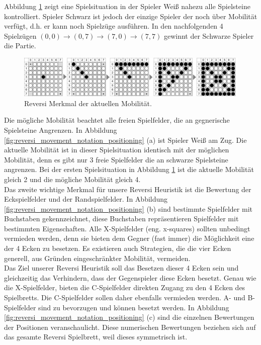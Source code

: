 Abbildung \ref{fig:reversi_maximum_disk_strategy} zeigt eine Spielsituation in der Spieler Weiß nahezu alle Spielsteine kontrolliert. Spieler Schwarz ist jedoch der einzige Spieler der noch über Mobilität verfügt, d.h. er kann noch Spielzüge ausführen. In den nachfolgenden 4 Spielzügen $(0,0) \rightarrow (0,7) \rightarrow (7,0) \rightarrow (7,7)$ gewinnt der Schwarze Spieler die Partie. \\

\begin{figure}[!htbp]
  \centering
  \includegraphics[scale = 0.3]{inhalt/abbildungen/reversi_maximum_disk_strategy.pdf}
  \caption{Reversi Merkmal der aktuellen Mobilität.}
  \label{fig:reversi_maximum_disk_strategy}
\end{figure}

Die mögliche Mobilität beachtet alle freien Spielfelder, die an gegnerische Spielsteine Angrenzen. In Abbildung \ref{fig:reversi_movement_notation_positioning} (a) ist Spieler Weiß am Zug. Die aktuelle Mobilität ist in dieser Spielsituation identisch mit der möglichen Mobilität, denn es gibt nur 3 freie Spielfelder die an schwarze Spielsteine angrenzen. Bei der ersten Spielsituation in Abbildung \ref{fig:reversi_maximum_disk_strategy} ist die aktuelle Mobilität gleich 2 und die mögliche Mobilität gleich 4.\\

Das zweite wichtige Merkmal für unsere Reversi Heuristik ist die Bewertung der Eckspielfelder und der Randspielfelder. In Abbildung \ref{fig:reversi_movement_notation_positioning} (b) sind bestimmte Spielfelder mit Buchstaben gekennzeichnet, diese Buchstaben repräsentieren Spielfelder mit bestimmten Eigenschaften. Alle X-Spielfelder (eng. x-squares) sollten unbedingt vermieden werden, denn sie bieten dem Gegner (fast immer) die Möglichkeit eine der 4 Ecken zu besetzen. Es existieren auch Strategien, die die vier Ecken generell, aus Gründen eingeschränkter Mobilität, vermeiden. \\

Das Ziel unserer Reversi Heuristik soll das Besetzen dieser 4 Ecken sein und gleichzeitig das Verhindern, dass der Gegenspieler diese Ecken besetzt. Genau wie die X-Spielfelder, bieten die C-Spielfelder direkten Zugang zu den 4 Ecken des Spielbretts. Die C-Spielfelder sollen daher ebenfalls vermieden werden. A- und B-Spielfelder sind zu bevorzugen und können besetzt werden. In Abbildung \ref{fig:reversi_movement_notation_positioning} (c) sind die einzelnen Bewertungen der Positionen veranschaulicht. Diese numerischen Bewertungen beziehen sich auf das gesamte Reversi Spielbrett, weil dieses symmetrisch ist.



